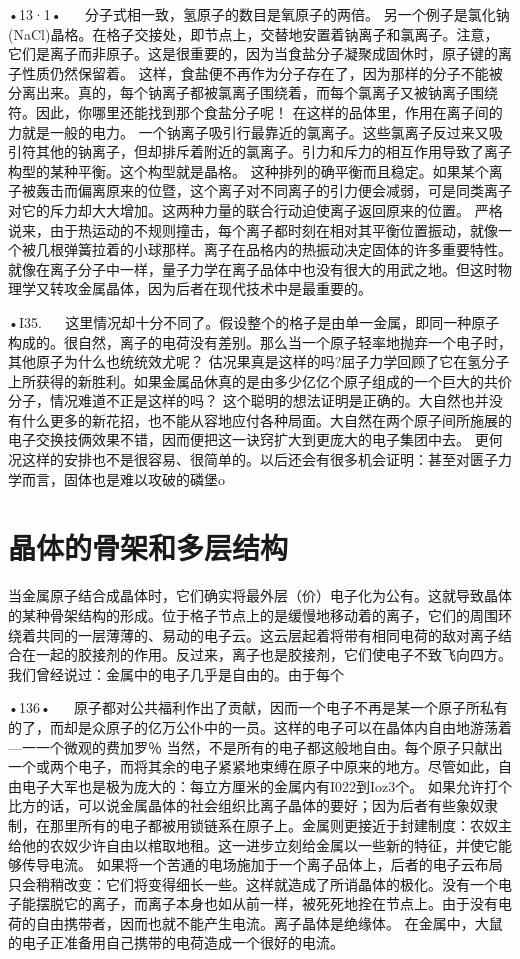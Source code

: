 •13·1•
  
分子式相一致，氢原子的数目是氧原子的两倍。
另一个例子是氯化钠(NaCl)晶格。在格子交接处，即节点上，交替地安置着钠离子和氯离子。注意，它们是离子而非原子。这是很重要的，因为当食盐分子凝聚成固休时，原子键的离子性质仍然保留着。
这样，食盐便不再作为分子存在了，因为那样的分子不能被分离出来。真的，每个钠离子都被氯离子围绕着，而每个氯离子又被钠离子围绕符。因此，你哪里还能找到那个食盐分子呢！
在这样的品体里，作用在离子间的力就是一般的电力。
一个钠离子吸引行最靠近的氯离子。这些氯离子反过来又吸引符其他的钠离子，但却排斥着附近的氯离子。引力和斥力的相互作用导致了离子构型的某种平衡。这个构型就是晶格。
这种排列的确平衡而且稳定。如果某个离子被轰击而偏离原来的位暨，这个离子对不同离子的引力便会减弱，可是同类离子对它的斥力却大大增加。这两种力量的联合行动迫使离子返回原来的位置。
严格说来，由于热运动的不规则撞击，每个离子都时刻在相对其平衡位置振动，就像一个被几根弹簧拉着的小球那样。离子在品格内的热振动决定固体的许多重要特性。
就像在离子分子中一样，量子力学在离子品体中也没有很大的用武之地。但这时物理学又转攻金属晶体，因为后者在现代技术中是最重要的。

•I35.
  
这里情况却十分不同了。假设整个的格子是由单一金属，即同一种原子构成的。很自然，离子的电荷没有差别。那么当一个原子轻率地抛弃一个电子时，其他原子为什么也统统效尤呢？
估况果真是这样的吗?屈子力学回顾了它在氢分子上所获得的新胜利。如果金属品休真的是由多少亿亿个原子组成的一个巨大的共价分子，情况难道不正是这样的吗？
这个聪明的想法证明是正确的。大自然也并没有什么更多的新花招，也不能从容地应付各种局面。大自然在两个原子间所施展的电子交换技俩效果不错，因而便把这一诀窍扩大到更庞大的电子集团中去。
更何况这样的安排也不是很容易、很简单的。以后还会有很多机会证明：甚至对匮子力学而言，固体也是难以攻破的磷堡o

\section{晶体的骨架和多层结构}

当金属原子结合成晶体时，它们确实将最外层（价）电子化为公有。这就导致晶体的某种骨架结构的形成。位于格子节点上的是缓慢地移动着的离子，它们的周围环绕着共同的一层薄薄的、易动的电子云。这云层起着将带有相同电荷的敌对离子结合在一起的胶接剂的作用。反过来，离子也是胶接剂，它们使电子不致飞向四方。
我们曾经说过：金属中的电子几乎是自由的。由于每个

•136•
  
原子都对公共福利作出了贡献，因而一个电子不再是某一个原子所私有的了，而却是众原子的亿万公仆中的一员。这样的电子可以在晶体内自由地游荡着—一一个微观的费加罗％
当然，不是所有的电子都这般地自由。每个原子只献出一个或两个电子，而将其余的电子紧紧地束缚在原子中原来的地方。尽管如此，自由电子大军也是极为庞大的：每立方厘米的金属内有I022到Ioz3个。
如果允许打个比方的话，可以说金属晶体的社会组织比离子晶体的要好；因为后者有些象奴隶制，在那里所有的电子都被用锁链系在原子上。金属则更接近于封建制度：农奴主给他的农奴少许自由以棺取地租。这一进步立刻给金属以一些新的特征，并使它能够传导电流。
如果将一个苦通的电场施加于一个离子品体上，后者的电子云布局只会稍稍改变：它们将变得细长一些。这样就造成了所诮晶体的极化。没有一个电子能摆脱它的离子，而离子本身也如从前一样，被死死地拴在节点上。由于没有电荷的自由携带者，因而也就不能产生电流。离子晶体是绝缘体。
在金属中，大鼠的电子正准备用自己携带的电荷造成一个很好的电流。

